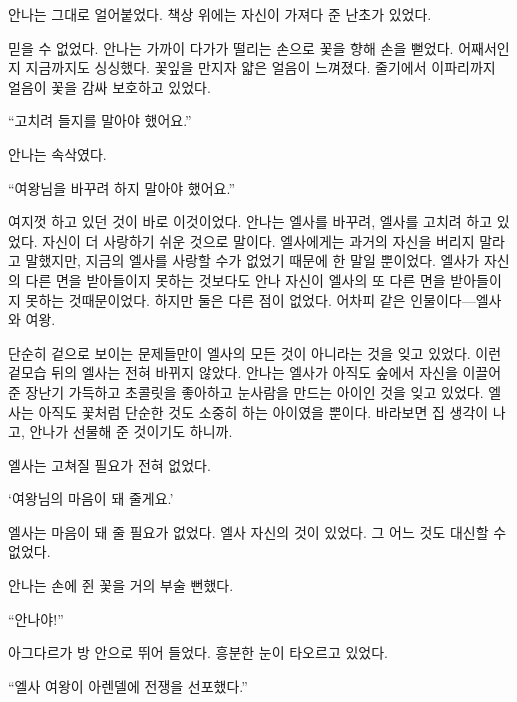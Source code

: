 안나는 그대로 얼어붙었다. 책상 위에는 자신이 가져다 준 난초가 있었다.

믿을 수 없었다. 안나는 가까이 다가가 떨리는 손으로 꽃을 향해 손을 뻗었다. 어째서인지 지금까지도 싱싱했다. 꽃잎을 만지자 얇은 얼음이 느껴졌다. 줄기에서 이파리까지 얼음이 꽃을 감싸 보호하고 있었다.

``고치려 들지를 말아야 했어요.''

안나는 속삭였다.

``여왕님을 바꾸려 하지 말아야 했어요.''

여지껏 하고 있던 것이 바로 이것이었다. 안나는 엘사를 바꾸려, 엘사를 고치려 하고 있었다. 자신이 더 사랑하기 쉬운 것으로 말이다. 엘사에게는 과거의 자신을 버리지 말라고 말했지만, 지금의 엘사를 사랑할 수가 없었기 때문에 한 말일 뿐이었다. 엘사가 자신의 다른 면을 받아들이지 못하는 것보다도 안나 자신이 엘사의 또 다른 면을 받아들이지 못하는 것때문이었다. 하지만 둘은 다른 점이 없었다. 어차피 같은 인물이다—엘사와 여왕.

단순히 겉으로 보이는 문제들만이 엘사의 모든 것이 아니라는 것을 잊고 있었다. 이런 겉모습 뒤의 엘사는 전혀 바뀌지 않았다. 안나는 엘사가 아직도 숲에서 자신을 이끌어 준 장난기 가득하고 초콜릿을 좋아하고 눈사람을 만드는 아이인 것을 잊고 있었다. 엘사는 아직도 꽃처럼 단순한 것도 소중히 하는 아이였을 뿐이다. 바라보면 집 생각이 나고, 안나가 선물해 준 것이기도 하니까.

엘사는 고쳐질 필요가 전혀 없었다.

`여왕님의 마음이 돼 줄게요.'

엘사는 마음이 돼 줄 필요가 없었다. 엘사 자신의 것이 있었다. 그 어느 것도 대신할 수 없었다.

안나는 손에 쥔 꽃을 거의 부술 뻔했다.

``안나야!''

아그다르가 방 안으로 뛰어 들었다. 흥분한 눈이 타오르고 있었다.

``엘사 여왕이 아렌델에 전쟁을 선포했다.''

